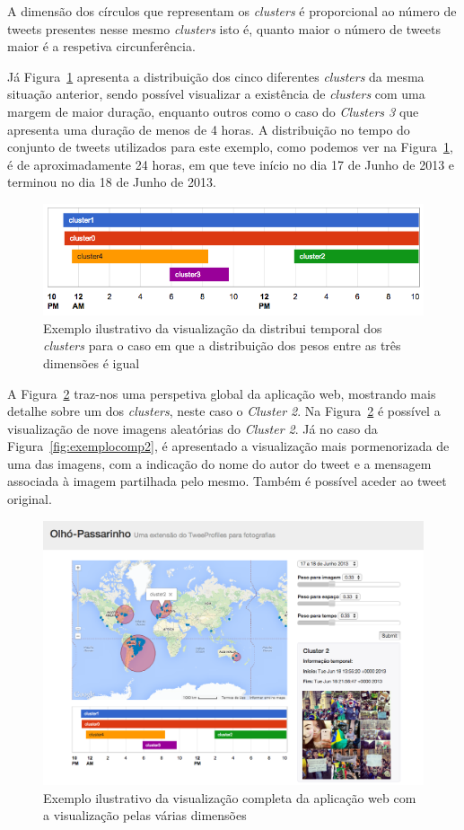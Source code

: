 A dimensão dos círculos que representam os \textit{clusters} é proporcional ao número de tweets presentes nesse mesmo \textit{clusters} isto é, quanto maior o número de tweets maior é a respetiva circunferência.

Já Figura~\ref{fig:time2} apresenta a distribuição dos cinco diferentes \textit{clusters} da mesma situação anterior, sendo possível visualizar a existência de \textit{clusters} com uma margem de maior duração, enquanto outros como o caso do \textit{Clusters 3} que apresenta uma duração de menos de 4 horas. A distribuição no tempo do conjunto de tweets utilizados para este exemplo, como podemos ver na Figura~\ref{fig:time2}, é de aproximadamente 24 horas, em que teve início no dia 17 de Junho de 2013 e terminou no dia 18 de Junho de 2013.

\begin{figure}[h]
\centering
\includegraphics[width=0.7\linewidth]{./figures/olhopassarinho/time2}
\caption{Exemplo ilustrativo da visualização da distribui temporal dos \textit{clusters} para o caso em que a distribuição dos pesos entre as três dimensões é igual}
\label{fig:time2}
\end{figure}

A Figura~\ref{fig:exemplocomp} traz-nos uma perspetiva global da aplicação web, mostrando mais detalhe sobre um dos \textit{clusters}, neste caso o \textit{Cluster 2}. Na Figura~\ref{fig:exemplocomp} é possível a visualização de nove imagens aleatórias do \textit{Cluster 2}. Já no caso da Figura~\ref{fig:exemplocomp2}, é apresentado a visualização mais pormenorizada de uma das imagens, com a indicação do nome do autor do tweet e a mensagem associada à imagem partilhada pelo mesmo. Também é possível aceder ao tweet original.

\begin{figure}[h]
\centering
\includegraphics[width=0.8\linewidth]{./figures/olhopassarinho/exemplo_comp}
\caption{Exemplo ilustrativo da visualização completa da aplicação web com a visualização pelas várias dimensões}
\label{fig:exemplocomp}
\end{figure}

